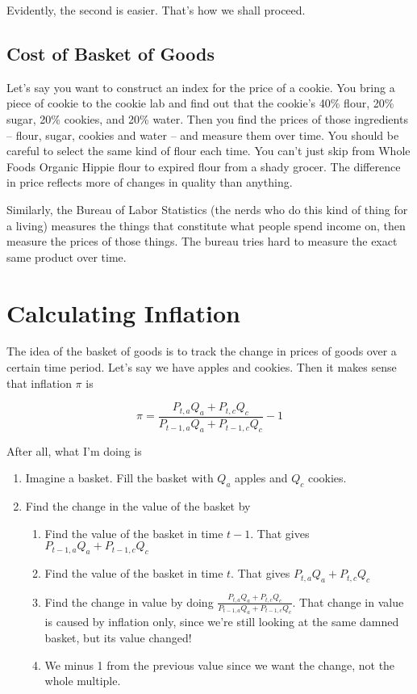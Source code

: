 \documentclass[11pt]{scrartcl}
\begin{document}
Evidently, the second is easier. That's how we shall proceed.

\subsection{Cost of Basket of Goods}
Let's say you want to construct an index for the price of a cookie. You bring a piece of cookie to the cookie lab and find out that the cookie's 40\% flour, 20\% sugar, 20\% cookies, and 20\% water. Then you find the prices of those ingredients -- flour, sugar, cookies and water -- and measure them over time. You should be careful to select the same kind of flour each time. You can't just skip from Whole Foods Organic Hippie flour to expired flour from a shady grocer. The difference in price reflects more of changes in quality than anything.

Similarly, the Bureau of Labor Statistics (the nerds who do this kind of thing for a living) measures the things that constitute what people spend income on, then measure the prices of those things. The bureau tries hard to measure the exact same product over time. 

\section{Calculating Inflation}

The idea of the basket of goods is to track the change in prices of goods over a certain time period. Let's say we have apples and cookies. Then it makes sense that inflation $\pi$ is

\[ \pi = \frac{P_{t,a} Q_a + P_{t,c} Q_c}{P_{t-1,a} Q_a + P_{t-1,c} Q_c} - 1\]

After all, what I'm doing is

\begin{enumerate}
\item Imagine a basket. Fill the basket with $Q_a$ apples and $Q_c$ cookies.
\item Find the change in the value of the basket by 
\begin{enumerate}
\item Find the value of the basket in time $t-1$. That gives $P_{t-1,a} Q_a + P_{t-1,c} Q_c$
\item Find the value of the basket in time $t$. That gives $P_{t,a} Q_a + P_{t,c} Q_c$
\item Find the change in value by doing $\frac{P_{t,a} Q_a + P_{t,c} Q_c}{P_{t-1,a} Q_a + P_{t-1,c} Q_c}$. That change in value is caused by inflation only, since we're still looking at the same damned basket, but its value changed!
\item We minus 1 from the previous value since we want the change, not the whole multiple. 
\end{enumerate}
\end{enumerate}
\end{document}
